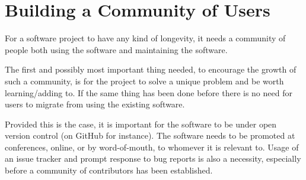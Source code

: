 \documentclass{article}
\begin{document}
\section*{Building a Community of Users}
For a software project to have any kind of longevity, it needs a community of people both using the software and maintaining the software.
\par
The first and possibly most important thing needed, to encourage the growth of such a community, is for the project to solve a unique problem and be worth learning/adding to. If the same thing has been done before there is no need for users to migrate from using the existing software.
\par
Provided this is the case, it is important for the software to be under open version control (on GitHub for instance). The software needs to be promoted at conferences, online, or by word-of-mouth, to whomever it is relevant to. Usage of an issue tracker and prompt response to bug reports is also a necessity, especially before a community of contributors has been established.
\end{document}
